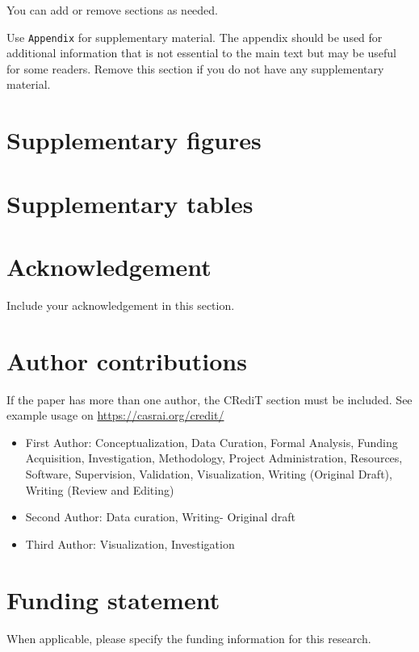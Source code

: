 \documentclass[
  manuscript=article,  %
  layout=preprint,  %
  year=20xx,
  volume=x,
]{extra/joas}
\begin{document}
You can add or remove sections as needed.

Use \verb|Appendix| for supplementary material. The appendix should be used for additional information that is not essential to the main text but may be useful for some readers. Remove this section if you do not have any supplementary material.

\appendix

\section{Supplementary figures}

\section{Supplementary tables}


\section*{Acknowledgement}
Include your acknowledgement in this section.

\section*{Author contributions}
If the paper has more than one author, the CRediT section must be included. See example usage on \url{https://casrai.org/credit/}

\begin{itemize}
  \item First Author: Conceptualization, Data Curation, Formal Analysis, Funding Acquisition, Investigation, Methodology, Project Administration, Resources, Software, Supervision, Validation, Visualization, Writing (Original Draft), Writing (Review and Editing)
  \item Second Author: Data curation, Writing- Original draft
  \item Third Author: Visualization, Investigation
\end{itemize}


\section*{Funding statement}
When applicable, please specify the funding information for this research.


\end{document}
